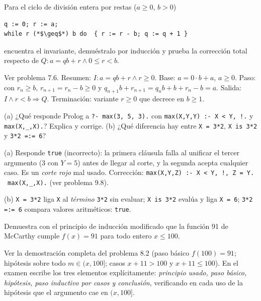 \begin{prob}[ · B4]
Para el ciclo de división entera por restas ($a\ge0$, $b>0$)
\begin{lstlisting}
q := 0; r := a;
while r (*$\geq$*) b do  { r := r - b; q := q + 1 }
\end{lstlisting}
encuentra el invariante, demuéstralo por inducción y prueba la corrección total respecto de $Q: a=qb+r\land0\le r<b$.
\end{prob}
\begin{sol}
Ver problema 7.6. Resumen: $I: a=qb+r\land r\ge0$. Base: $a=0\cdot b+a$, $a\ge0$. Paso: con $r_n\ge b$, $r_{n+1}=r_n-b\ge0$ y $q_{n+1}b+r_{n+1}=q_nb+b+r_n-b=a$. Salida: $I\land r<b\Rightarrow Q$. Terminación: variante $r\ge0$ que decrece en $b\ge1$.
\end{sol}

\begin{prob}[ · B5]
(a) ¿Qué responde Prolog a \texttt{?- max(3, 5, 3).} con \texttt{max(X,Y,Y) :- X < Y, !.} y \texttt{max(X,\_,X).}? Explica y corrige. (b) ¿Qué diferencia hay entre \texttt{X = 3*2}, \texttt{X is 3*2} y \texttt{3*2 =:= 6}?
\end{prob}
\begin{sol}
(a) Responde \texttt{true} (incorrecto): la primera cláusula falla al unificar el tercer argumento ($3$ con $Y=5$) antes de llegar al corte, y la segunda acepta cualquier caso. Es un \emph{corte rojo} mal usado. Corrección: \texttt{max(X,Y,Z) :- X < Y, !, Z = Y.} \ \texttt{max(X,\_,X).} (ver problema 9.8).

(b) \texttt{X = 3*2} liga \texttt{X} al \emph{término} \texttt{3*2} sin evaluar; \texttt{X is 3*2} evalúa y liga \texttt{X = 6}; \texttt{3*2 =:= 6} compara valores aritméticos: \texttt{true}.
\end{sol}

\begin{prob}[ · B6]
Demuestra con el principio de inducción modificado que la función 91 de McCarthy cumple $f(x)=91$ para todo entero $x\le100$.
\end{prob}
\begin{sol}
Ver la demostración completa del problema 8.2 (paso básico $f(100)=91$; hipótesis sobre todo $m\in(x,100]$; casos $x+11>100$ y $x+11\le100$). En el examen escribe los tres elementos explícitamente: \emph{principio usado, paso básico, hipótesis, paso inductivo por casos y conclusión}, verificando en cada uso de la hipótesis que el argumento cae en $(x,100]$.
\end{sol}

